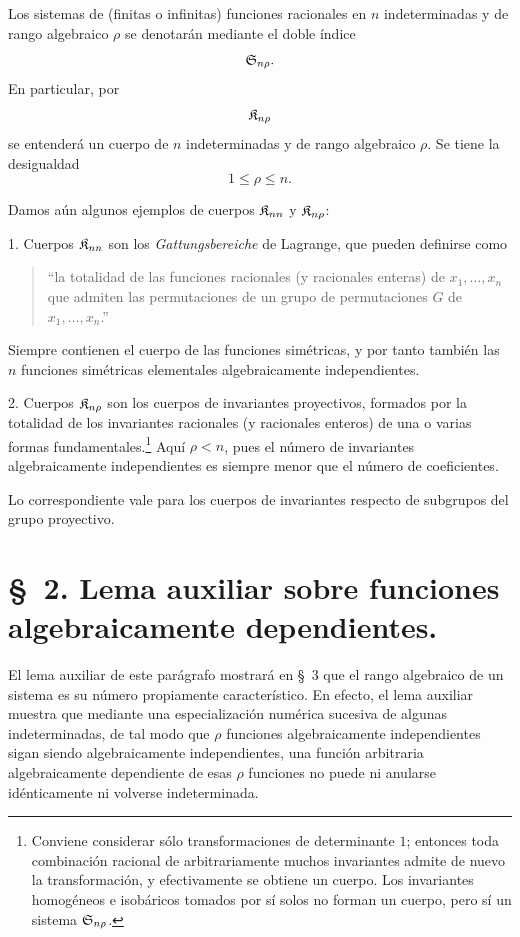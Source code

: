 \documentclass[11pt]{article}
\begin{document}
Los sistemas de (finitas o infinitas) funciones racionales en $n$ indeterminadas y de rango algebraico $\rho$ se denotarán mediante el doble índice
\[
  \mathfrak{S}_{n\rho}.
\]
En particular, por
\[
  \mathfrak{K}_{n\rho}
\]
se entenderá un cuerpo de $n$ indeterminadas y de rango algebraico $\rho$. Se tiene la desigualdad
\[
  1\leq \rho\leq n.
\]

Damos aún algunos ejemplos de cuerpos $\mathfrak{K}_{nn}$ y $\mathfrak{K}_{n\rho}$:

1. Cuerpos $\mathfrak{K}_{nn}$ son los \emph{Gattungsbereiche} de Lagrange, que pueden definirse como
\begin{quote}
``la totalidad de las funciones racionales (y racionales enteras) de $x_1,\ldots,x_n$ que admiten las permutaciones de un grupo de permutaciones $G$ de $x_1,\ldots,x_n$.''
\end{quote}
Siempre contienen el cuerpo de las funciones simétricas, y por tanto también las $n$ funciones simétricas elementales algebraicamente independientes.

2. Cuerpos $\mathfrak{K}_{n\rho}$ son los cuerpos de invariantes proyectivos, formados por la totalidad de los invariantes racionales (y racionales enteros) de una o varias formas fundamentales.\footnote{Conviene considerar sólo transformaciones de determinante $1$; entonces toda combinación racional de arbitrariamente muchos invariantes admite de nuevo la transformación, y efectivamente se obtiene un cuerpo. Los invariantes homogéneos e isobáricos tomados por sí solos no forman un cuerpo, pero sí un sistema $\mathfrak{S}_{n\rho}$.} Aquí $\rho<n$, pues el número de invariantes algebraicamente independientes es siempre menor que el número de coeficientes.

Lo correspondiente vale para los cuerpos de invariantes respecto de subgrupos del grupo proyectivo.

\section*{\S\ 2. Lema auxiliar sobre funciones algebraicamente dependientes.}

El lema auxiliar de este parágrafo mostrará en \S\ 3 que el rango algebraico de un sistema es su número propiamente característico. En efecto, el lema auxiliar muestra que mediante una especialización numérica sucesiva de algunas indeterminadas, de tal modo que $\rho$ funciones algebraicamente independientes sigan siendo algebraicamente independientes, una función arbitraria algebraicamente dependiente de esas $\rho$ funciones no puede ni anularse idénticamente ni volverse indeterminada.
\end{document}
